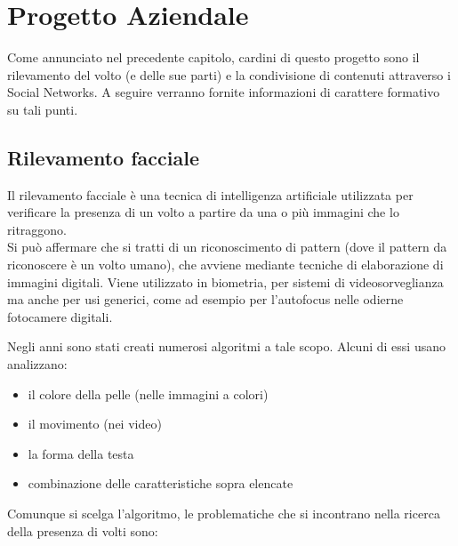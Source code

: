 
\chapter{Progetto Aziendale} %

\label{Chapter2} %


Come annunciato nel precedente capitolo, cardini di questo progetto sono il rilevamento del volto (e delle sue parti) e la condivisione di contenuti attraverso i Social Networks.
A seguire verranno fornite informazioni di carattere formativo su tali punti.

\section{Rilevamento facciale}

Il rilevamento facciale è una tecnica di intelligenza artificiale utilizzata per verificare la presenza di un volto a partire da una o più immagini che lo ritraggono.\\
Si può affermare che si tratti di un riconoscimento di pattern (dove il pattern da riconoscere è un volto umano), che avviene mediante tecniche di elaborazione di immagini digitali. Viene utilizzato in biometria, per sistemi di videosorveglianza ma anche per usi generici, come ad esempio per l'autofocus nelle odierne fotocamere digitali. 

Negli anni sono stati creati numerosi algoritmi a tale scopo.
Alcuni di essi usano analizzano:

\begin{itemize}
\item il colore della pelle (nelle immagini a colori)
\item il movimento (nei video)
\item la forma della testa
\item combinazione delle caratteristiche sopra elencate
\end{itemize}

Comunque si scelga l'algoritmo, le problematiche che si incontrano nella ricerca della presenza di volti sono:

